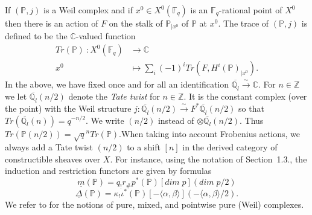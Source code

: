 \documentclass[a4paper,10pt]{amsart}
\def\Z{\mathbb{Z}}
\def\a{\alpha}
\def\qlb{\overline{\mathbb{Q}_l}}
\def\C{\mathbb{C}}
\def\fq{\mathbb{F}_q}
\numberwithin{equation}{section}
\begin{document}
If $(\mathbb{P},j)$ is a Weil complex and if $x^0 \in X^0(\fq)$ is an $\fq$-rational point of $X^0$ then there is an action of $F$ on the stalk of $\mathbb{P}_{|x^0}$ of $\mathbb{P}$ at $x^0$. The trace of $(\mathbb{P},j)$ is defined to be the $\C$-valued function
\begin{equation}\label{E:Trace}
\begin{split}
Tr (\mathbb{P})~: X^0(\fq) &\to \C\\
x^0 &\mapsto \sum_{i} (-1)^i Tr(F, H^i(\mathbb{P})_{|x^0}).
\end{split}
\end{equation}
In the above, we have fixed once and for all an identification $\qlb \stackrel{\sim}{\to} \C$.
For $n \in \Z$ we let $\qlb(n/2)$ denote the \textit{Tate twist} for $n \in \Z$. 
 It is the constant complex (over the point) with the Weil structure $j: \qlb(n/2) \stackrel{\sim}{\to} F^* \qlb(n/2)$ so that $Tr(\qlb(n))=q^{-n/2}$.
We write $(n/2)$ instead of $\otimes \qlb(n/2)$. 
Thus $Tr(\mathbb{P}(n/2))=\sqrt{q}^{n}Tr(\mathbb{P})$.When taking into account Frobenius actions, we always add a Tate twist $(n/2)$ to a shift $[n]$ in the derived category of constructible sheaves over $X$. For instance, using the notation of Section~1.3., the induction and restriction functors are given by formulas
$$\underline{m}(\mathbb{P})= q_!r_{\#}p^*(\mathbb{P})[dim\;p](dim\;p/2)$$
$$\underline{\Delta}(\mathbb{P})=\kappa_! \iota^*(\mathbb{P})[-\langle \a,\beta \rangle](-\langle \a,\beta\rangle /2).$$
We refer to \cite{FK} for the notions of pure, mixed, and pointwise pure (Weil) complexes.

\vspace{.1in}
\end{document}
